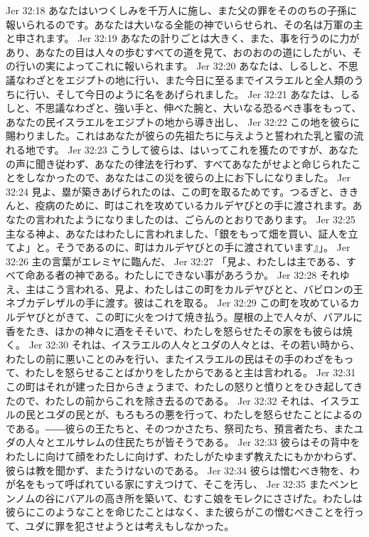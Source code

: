 Jer 32:18  あなたはいつくしみを千万人に施し、また父の罪をそののちの子孫に報いられるのです。あなたは大いなる全能の神でいらせられ、その名は万軍の主と申されます。
Jer 32:19  あなたの計りごとは大きく、また、事を行うのに力があり、あなたの目は人々の歩むすべての道を見て、おのおのの道にしたがい、その行いの実によってこれに報いられます。
Jer 32:20  あなたは、しるしと、不思議なわざとをエジプトの地に行い、また今日に至るまでイスラエルと全人類のうちに行い、そして今日のように名をあげられました。
Jer 32:21  あなたは、しるしと、不思議なわざと、強い手と、伸べた腕と、大いなる恐るべき事をもって、あなたの民イスラエルをエジプトの地から導き出し、
Jer 32:22  この地を彼らに賜わりました。これはあなたが彼らの先祖たちに与えようと誓われた乳と蜜の流れる地です。
Jer 32:23  こうして彼らは、はいってこれを獲たのですが、あなたの声に聞き従わず、あなたの律法を行わず、すべてあなたがせよと命じられたことをしなかったので、あなたはこの災を彼らの上にお下しになりました。
Jer 32:24  見よ、塁が築きあげられたのは、この町を取るためです。つるぎと、ききんと、疫病のために、町はこれを攻めているカルデヤびとの手に渡されます。あなたの言われたようになりましたのは、ごらんのとおりであります。
Jer 32:25  主なる神よ、あなたはわたしに言われました、「銀をもって畑を買い、証人を立てよ」と。そうであるのに、町はカルデヤびとの手に渡されています』」。
Jer 32:26  主の言葉がエレミヤに臨んだ、
Jer 32:27  「見よ、わたしは主である、すべて命ある者の神である。わたしにできない事があろうか。
Jer 32:28  それゆえ、主はこう言われる、見よ、わたしはこの町をカルデヤびとと、バビロンの王ネブカデレザルの手に渡す。彼はこれを取る。
Jer 32:29  この町を攻めているカルデヤびとがきて、この町に火をつけて焼き払う。屋根の上で人々が、バアルに香をたき、ほかの神々に酒をそそいで、わたしを怒らせたその家をも彼らは焼く。
Jer 32:30  それは、イスラエルの人々とユダの人々とは、その若い時から、わたしの前に悪いことのみを行い、またイスラエルの民はその手のわざをもって、わたしを怒らせることばかりをしたからであると主は言われる。
Jer 32:31  この町はそれが建った日からきょうまで、わたしの怒りと憤りとをひき起してきたので、わたしの前からこれを除き去るのである。
Jer 32:32  それは、イスラエルの民とユダの民とが、もろもろの悪を行って、わたしを怒らせたことによるのである。――彼らの王たちと、そのつかさたち、祭司たち、預言者たち、またユダの人々とエルサレムの住民たちが皆そうである。
Jer 32:33  彼らはその背中をわたしに向けて顔をわたしに向けず、わたしがたゆまず教えたにもかかわらず、彼らは教を聞かず、またうけないのである。
Jer 32:34  彼らは憎むべき物を、わが名をもって呼ばれている家にすえつけて、そこを汚し、
Jer 32:35  またベンヒンノムの谷にバアルの高き所を築いて、むすこ娘をモレクにささげた。わたしは彼らにこのようなことを命じたことはなく、また彼らがこの憎むべきことを行って、ユダに罪を犯させようとは考えもしなかった。
